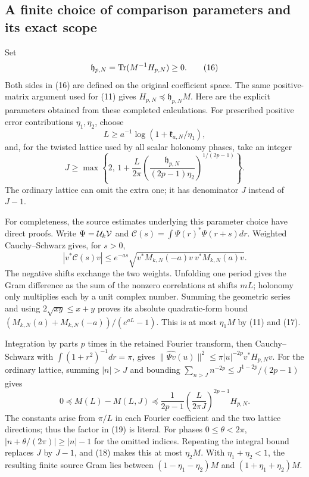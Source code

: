 \subsection{A finite choice of comparison parameters and its exact scope}
Set
\[
 \mathfrak h_{p,N}=\operatorname{Tr}(M^{-1}H_{p,N})\ge0.
 \tag{16}
\]
Both sides in (16) are defined on the original coefficient space.
The same positive-matrix argument used for (11) gives
\(H_{p,N}\preceq\mathfrak h_{p,N}M\).
Here are the explicit parameters obtained from these completed
calculations. For prescribed positive error contributions
\(\eta_1,\eta_2\), choose
\[
 L\ge a^{-1}\log(1+\mathfrak k_{a,N}/\eta_1),
 \tag{17}
\]
and, for the twisted lattice used by all scalar holonomy phases, take an integer
\[
 J\ge\max\left\{2,\,
 1+\frac L{2\pi}
 \left(\frac{\mathfrak h_{p,N}}{(2p-1)\eta_2}\right)^{1/(2p-1)}
 \right\}.
 \tag{18}
\]
The ordinary lattice can omit the extra one; it has denominator
\(J\) instead of \(J-1\).

For completeness, the source estimates underlying this parameter
choice have direct proofs. Write \(\Psi=\mathcal U_k\mathcal V\) and
\(\mathcal C(s)=\int\Psi(r)^*\Psi(r+s)dr\). Weighted
Cauchy--Schwarz gives, for \(s>0\),
\[
 |v^*\mathcal C(s)v|
 \le e^{-as}\sqrt{v^*M_{k,N}(-a)v\ v^*M_{k,N}(a)v}.
\]
The negative shifts exchange the two weights. Unfolding one period
gives the Gram difference as the sum of the nonzero correlations
at shifts \(mL\); holonomy only multiplies each by a unit complex
number. Summing the geometric series and using \(2\sqrt{xy}\le x+y\)
proves its absolute quadratic-form bound
\((M_{k,N}(a)+M_{k,N}(-a))/(e^{aL}-1)\).
This is at most \(\eta_1M\) by (11) and (17).

Integration by parts \(p\) times in the retained Fourier transform,
then Cauchy--Schwarz with
\(\int(1+r^2)^{-1}dr=\pi\), gives
\(\|\widehat{\Psi v}(u)\|^2\le
\pi |u|^{-2p}v^*H_{p,N}v\).
For the ordinary lattice, summing \(|n|>J\) and bounding
\(\sum_{n>J}n^{-2p}\le J^{1-2p}/(2p-1)\) gives
\[
 0\preceq M(L)-M(L,J)
 \preceq\frac1{2p-1}\left(\frac L{2\pi J}\right)^{2p-1}H_{p,N}.
 \tag{19}
\]
The constants arise from \(\pi/L\) in each Fourier coefficient and
the two lattice directions; thus the factor in (19) is literal.
For phases \(0\le\theta<2\pi\),
\(|n+\theta/(2\pi)|\ge |n|-1\) for the omitted indices. Repeating
the integral bound replaces \(J\) by \(J-1\), and (18) makes this
at most \(\eta_2M\). With \(\eta_1+\eta_2<1\), the resulting
finite source Gram lies between
\((1-\eta_1-\eta_2)M\) and
\((1+\eta_1+\eta_2)M\).

